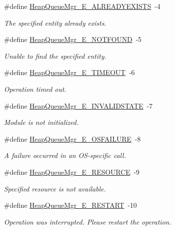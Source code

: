 \begin{DoxyCompactItemize}
\#define \hyperlink{_heap_queue_mgr_8h_aba2ac065bd410225bc597a439b655fb8}{HeapQueueMgr\_\-E\_\-ALREADYEXISTS}~-\/4
\begin{DoxyCompactList}\small\item\em The specified entity already exists. \item\end{DoxyCompactList}\item 
\#define \hyperlink{_heap_queue_mgr_8h_af0906a7b1837e6d71d79abafccecb041}{HeapQueueMgr\_\-E\_\-NOTFOUND}~-\/5
\begin{DoxyCompactList}\small\item\em Unable to find the specified entity. \item\end{DoxyCompactList}\item 
\#define \hyperlink{_heap_queue_mgr_8h_ae4b75e9be7a3b3f2dcf018b0363dd6a2}{HeapQueueMgr\_\-E\_\-TIMEOUT}~-\/6
\begin{DoxyCompactList}\small\item\em Operation timed out. \item\end{DoxyCompactList}\item 
\#define \hyperlink{_heap_queue_mgr_8h_a30319897d366fc31285bb82bc57c1f8f}{HeapQueueMgr\_\-E\_\-INVALIDSTATE}~-\/7
\begin{DoxyCompactList}\small\item\em Module is not initialized. \item\end{DoxyCompactList}\item 
\#define \hyperlink{_heap_queue_mgr_8h_abd0ef27ce9d730cb6c3f2623e77d61db}{HeapQueueMgr\_\-E\_\-OSFAILURE}~-\/8
\begin{DoxyCompactList}\small\item\em A failure occurred in an OS-\/specific call. \item\end{DoxyCompactList}\item 
\#define \hyperlink{_heap_queue_mgr_8h_a660d36c45ecb943232a0bd1082e982d9}{HeapQueueMgr\_\-E\_\-RESOURCE}~-\/9
\begin{DoxyCompactList}\small\item\em Specified resource is not available. \item\end{DoxyCompactList}\item 
\#define \hyperlink{_heap_queue_mgr_8h_ab4dcefa9809961eb06ab98bb60e58aa4}{HeapQueueMgr\_\-E\_\-RESTART}~-\/10
\begin{DoxyCompactList}\small\item\em Operation was interrupted. Please restart the operation. \item\end{DoxyCompactList}\end{DoxyCompactItemize}
